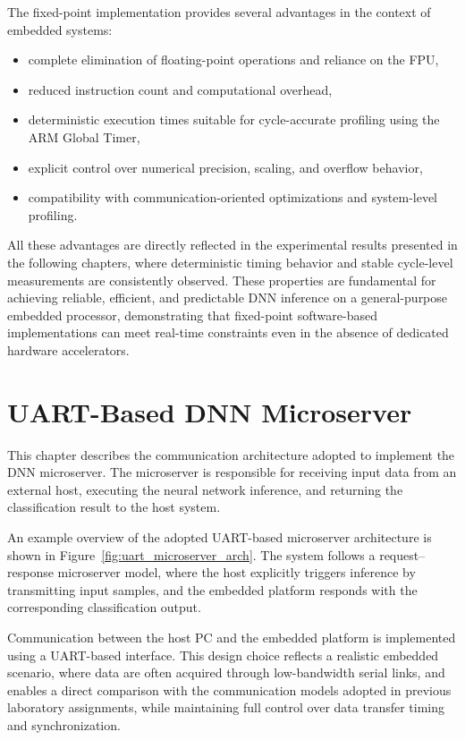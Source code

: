 The fixed-point implementation provides several advantages in the context of
embedded systems:
\begin{itemize}
    \item complete elimination of floating-point operations and reliance on the FPU,
    \item reduced instruction count and computational overhead,
    \item deterministic execution times suitable for cycle-accurate profiling using
          the ARM Global Timer,
    \item explicit control over numerical precision, scaling, and overflow behavior,
    \item compatibility with communication-oriented optimizations and system-level
          profiling.
\end{itemize}

All these advantages are directly reflected in the experimental results presented
in the following chapters, where deterministic timing behavior and stable
cycle-level measurements are consistently observed.
These properties are fundamental for achieving reliable, efficient, and
predictable DNN inference on a general-purpose embedded processor, demonstrating
that fixed-point software-based implementations can meet real-time constraints
even in the absence of dedicated hardware accelerators.


\chapter{UART-Based DNN Microserver}

This chapter describes the communication architecture adopted to implement the
DNN microserver.
The microserver is responsible for receiving input data from an external host,
executing the neural network inference, and returning the classification result
to the host system.

An example overview of the adopted UART-based microserver architecture is shown in
Figure~\ref{fig:uart_microserver_arch}.
The system follows a request--response microserver model, where the host
explicitly triggers inference by transmitting input samples, and the embedded
platform responds with the corresponding classification output.

Communication between the host PC and the embedded platform is implemented using
a UART-based interface.
This design choice reflects a realistic embedded scenario, where data are often
acquired through low-bandwidth serial links, and enables a direct comparison with
the communication models adopted in previous laboratory assignments, while
maintaining full control over data transfer timing and synchronization.


